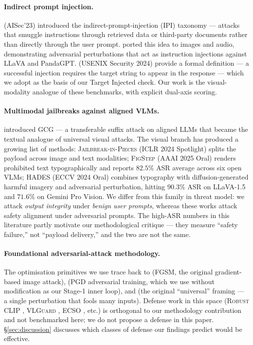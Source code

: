 \paragraph{Indirect prompt injection.}
\citet{greshake2023indirect} (AISec'23) introduced the indirect-prompt-injection (IPI) taxonomy --- attacks that smuggle instructions through retrieved data or third-party documents rather than directly through the user prompt. \citet{bagdasaryan2023imagessounds} ported this idea to images and audio, demonstrating adversarial perturbations that act as instruction injections against LLaVA and PandaGPT. \citet{liu2024formalizing} (USENIX Security 2024) provide a formal definition --- a successful injection requires the target string to appear in the response --- which we adopt as the basis of our Target Injected check. Our work is the visual-modality analogue of these benchmarks, with explicit dual-axis scoring.

\paragraph{Multimodal jailbreaks against aligned VLMs.}
\citet{zou2023gcg} introduced GCG --- a transferable suffix attack on aligned LLMs that became the textual analogue of universal visual attacks. The visual branch has produced a growing list of methods: \textsc{Jailbreak-in-Pieces} \citep{shayegani2024jailbreak} (ICLR 2024 Spotlight) splits the payload across image and text modalities; \textsc{FigStep} \citep{gong2025figstep} (AAAI 2025 Oral) renders prohibited text typographically and reports $82.5\%$ ASR average across six open VLMs; \textsc{HADES} \citep{li2024hades} (ECCV 2024 Oral) combines typography with diffusion-generated harmful imagery and adversarial perturbation, hitting $90.3\%$ ASR on LLaVA-1.5 and $71.6\%$ on Gemini Pro Vision. We differ from this family in threat model: we attack \emph{output integrity} under \emph{benign user prompts}, whereas these works attack safety alignment under adversarial prompts. The high-ASR numbers in this literature partly motivate our methodological critique --- they measure ``safety failure,'' not ``payload delivery,'' and the two are not the same.

\paragraph{Foundational adversarial-attack methodology.}
The optimisation primitives we use trace back to \citet{goodfellow2015explaining} (FGSM, the original gradient-based image attack), \citet{madry2018pgd} (PGD adversarial training, which we use without modification as our Stage-1 inner loop), and \citet{moosavi2017uap} (the original ``universal'' framing --- a single perturbation that fools many inputs). Defense work in this space (\textsc{Robust CLIP} \citep{schlarmann2024robustclip}, \textsc{VLGuard} \citep{zong2024vlguard}, \textsc{ECSO} \citep{gou2024ecso}, etc.) is orthogonal to our methodology contribution and not benchmarked here; we do not propose a defense in this paper. \S\ref{sec:discussion} discusses which classes of defense our findings predict would be effective.

